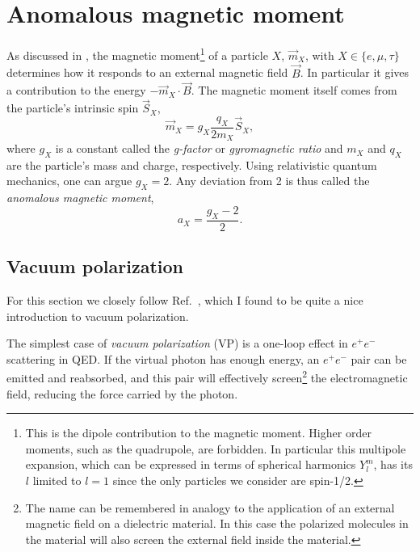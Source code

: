 \section{Anomalous magnetic moment}\label{sec:magAnom}
As discussed in ,
the magnetic moment\footnote{This is the dipole contribution to the
magnetic moment. Higher order moments, such as the quadrupole, are forbidden.
In particular this multipole expansion, which can be expressed in
terms of spherical harmonics $Y_l^m$, has its $l$ limited to $l=1$
since the only particles we consider are spin-1/2.} 
of a particle $X$, $\vec{m}_X$,
with $X\in\{e,\mu,\tau\}$
determines how it responds to an external magnetic field $\vec{B}$. In particular it
gives a contribution to the energy $-\vec{m}_X\cdot\vec{B}$.
The magnetic moment itself comes from the particle's intrinsic spin $\vec{S}_X$,
\begin{equation}
  \vec{m}_X=g_X\frac{q_X}{2m_X}\vec{S}_X,
\end{equation}
where $g_X$ is a constant called the {\it g-factor}
or {\it gyromagnetic ratio} and
$m_X$ and $q_X$ are the particle's mass and charge, respectively.
Using relativistic quantum mechanics, one can argue $g_X=2$. Any
deviation from 2 is thus called the {\it anomalous magnetic moment},
\begin{equation}
  a_X=\frac{g_X-2}{2}.
\end{equation}


\subsection{Vacuum polarization}\label{sec:VP}

For this section we closely follow Ref.~\cite{maiani_hadron_2016}, 
which I found to be quite
a nice introduction to vacuum polarization.

The simplest case of {\it vacuum polarization} (VP) is a one-loop effect in
$e^+e^-$ scattering in QED. If the virtual photon has enough energy,
an $e^+e^-$ pair can be emitted and reabsorbed, and this
pair will effectively screen\footnote{The name can be remembered in analogy to
the application of an external magnetic field on a dielectric material.
In this case the polarized molecules in the material will also screen
the external field inside the material.} the electromagnetic field, reducing the force
carried by the photon.

